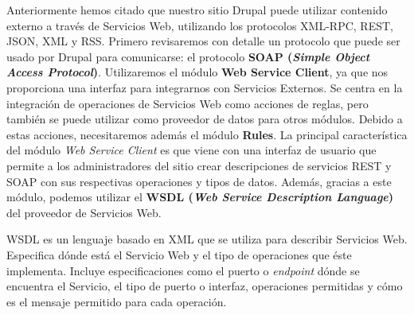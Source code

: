 Anteriormente hemos citado que nuestro sitio Drupal puede utilizar contenido externo a través de Servicios 
Web, utilizando los protocolos XML-RPC, REST, JSON, XML y RSS. Primero revisaremos con detalle un protocolo 
que puede ser usado por Drupal para comunicarse: el protocolo \textbf{SOAP (\textit{Simple Object Access Protocol})}.
Utilizaremos el módulo \textbf{Web Service Client}, ya que nos proporciona una interfaz para integrarnos 
con Servicios Externos. Se centra en la integración de operaciones de Servicios Web como acciones de reglas, 
pero también se puede utilizar como proveedor de datos para otros módulos. Debido a estas acciones, necesitaremos 
además el módulo \textbf{Rules}. La principal característica del módulo \textit{Web Service Client} es que 
viene con una interfaz de usuario que permite a los administradores del sitio crear descripciones de 
servicios REST y SOAP con sus respectivas operaciones y tipos de datos. Además, gracias a este módulo, 
podemos utilizar el \textbf{WSDL (\textit{Web Service Description Language})} del proveedor de Servicios Web.

WSDL es un lenguaje basado en XML que se utiliza para describir Servicios Web. Especifica dónde está el 
Servicio Web y el tipo de operaciones que éste implementa. Incluye especificaciones como el puerto 
o \textit{endpoint} dónde se encuentra el Servicio, el tipo de puerto o interfaz, operaciones permitidas y 
cómo es el mensaje permitido para cada operación. 


 